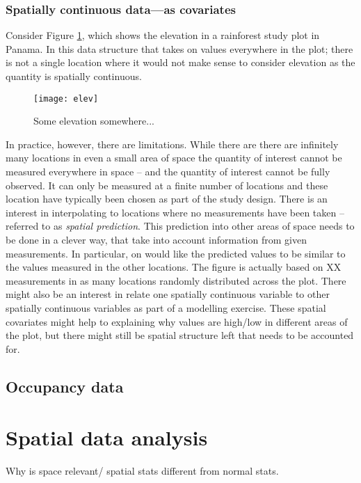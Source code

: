 \subsubsection{Spatially continuous data---as covariates}

Consider Figure \ref{fig:elev}, which shows the elevation in a rainforest study plot in Panama. In this data structure that  takes on values everywhere in the plot; there is not a single location where it would not make sense to consider elevation as the quantity is spatially continuous.
\begin{figure}
\centering
\texttt{[image: elev]}
\caption{\label{fig:elev} Some elevation somewhere...}
\end{figure}
In practice, however, there are limitations. While there are there are infinitely many locations in even a small area of space the quantity of interest cannot be measured everywhere in space -- and the quantity of interest cannot be fully observed. It can only be measured at a finite number of locations and these location have typically been chosen as part of the study design. There is an interest in interpolating to locations where no measurements have been taken -- referred to as \textit{spatial prediction}. This prediction into other areas of space needs to be done in a clever way, that take into account information from given measurements. In particular, on would like the predicted values to be similar to the values measured in the other locations. The figure is actually based on XX measurements in as many locations randomly distributed across the plot. There might also be an interest in relate one spatially continuous variable to other spatially continuous variables as part of a modelling exercise. These spatial covariates might help to explaining why values are high/low in different areas of the plot, but there might still be spatial structure left that needs to be accounted for.



\subsection{Occupancy data}


\section{Spatial data analysis}
Why is space relevant/ spatial stats different from normal stats.

